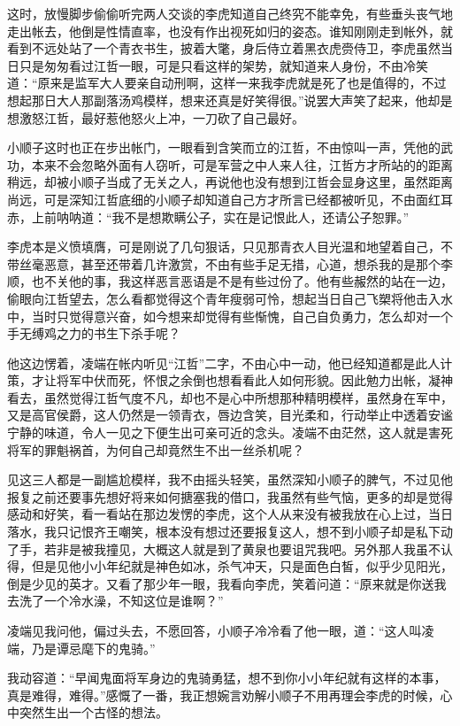 这时，放慢脚步偷偷听完两人交谈的李虎知道自己终究不能幸免，有些垂头丧气地走出帐去，他倒是性情直率，也没有作出视死如归的姿态。谁知刚刚走到帐外，就看到不远处站了一个青衣书生，披着大氅，身后侍立着黑衣虎赍侍卫，李虎虽然当日只是匆匆看过江哲一眼，可是只看这样的架势，就知道来人身份，不由冷笑道：“原来是监军大人要亲自动刑啊，这样一来我李虎就是死了也是值得的，不过想起那日大人那副落汤鸡模样，想来还真是好笑得很。”说罢大声笑了起来，他却是想激怒江哲，最好惹他怒火上冲，一刀砍了自己最好。

小顺子这时也正在步出帐门，一眼看到含笑而立的江哲，不由惊叫一声，凭他的武功，本来不会忽略外面有人窃听，可是军营之中人来人往，江哲方才所站的的距离稍远，却被小顺子当成了无关之人，再说他也没有想到江哲会显身这里，虽然距离尚远，可是深知江哲底细的小顺子却知道自己方才所言已经都被听见，不由面红耳赤，上前呐呐道：“我不是想欺瞒公子，实在是记恨此人，还请公子恕罪。”

李虎本是义愤填膺，可是刚说了几句狠话，只见那青衣人目光温和地望着自己，不带丝毫恶意，甚至还带着几许激赏，不由有些手足无措，心道，想杀我的是那个李顺，也不关他的事，我这样恶言恶语是不是有些过份了。他有些赧然的站在一边，偷眼向江哲望去，怎么看都觉得这个青年瘦弱可怜，想起当日自己飞槊将他击入水中，当时只觉得意兴奋，如今想来却觉得有些惭愧，自己自负勇力，怎么却对一个手无缚鸡之力的书生下杀手呢？

他这边愣着，凌端在帐内听见“江哲”二字，不由心中一动，他已经知道都是此人计策，才让将军中伏而死，怀恨之余倒也想看看此人如何形貌。因此勉力出帐，凝神看去，虽然觉得江哲气度不凡，却也不是心中所想那种精明模样，虽然身在军中，又是高官侯爵，这人仍然是一领青衣，唇边含笑，目光柔和，行动举止中透着安谧宁静的味道，令人一见之下便生出可亲可近的念头。凌端不由茫然，这人就是害死将军的罪魁祸首，为何自己却竟然生不出一丝杀机呢？

见这三人都是一副尴尬模样，我不由摇头轻笑，虽然深知小顺子的脾气，不过见他报复之前还要事先想好将来如何搪塞我的借口，我虽然有些气恼，更多的却是觉得感动和好笑，看一看站在那边发愣的李虎，这个人从来没有被我放在心上过，当日落水，我只记恨齐王嘲笑，根本没有想过还要报复这人，想不到小顺子却是私下动了手，若非是被我撞见，大概这人就是到了黄泉也要诅咒我吧。另外那人我虽不认得，但是见他小小年纪就是神色如冰，杀气冲天，只是面色白皙，似乎少见阳光，倒是少见的英才。又看了那少年一眼，我看向李虎，笑着问道：“原来就是你送我去洗了一个冷水澡，不知这位是谁啊？”

凌端见我问他，偏过头去，不愿回答，小顺子冷冷看了他一眼，道：“这人叫凌端，乃是谭忌麾下的鬼骑。”

我动容道：“早闻鬼面将军身边的鬼骑勇猛，想不到你小小年纪就有这样的本事，真是难得，难得。”感慨了一番，我正想婉言劝解小顺子不用再理会李虎的时候，心中突然生出一个古怪的想法。

